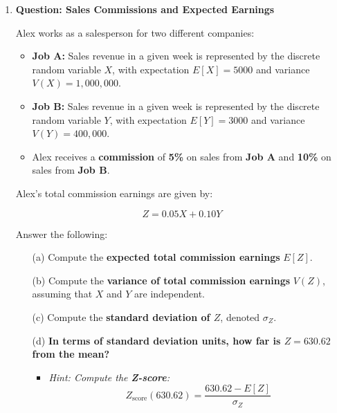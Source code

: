 \documentclass{article}
\newcommand{\blankbox}[2][3cm]{%
    \vspace{-0.5em}
    \begin{figure}[H]
        \makebox[\linewidth]{%
            \begin{tcolorbox}[
                colback=white, 
                colframe=black, 
                width=#2, %
                height=#1,
                boxrule=0.2mm
            ]
            \end{tcolorbox}
        }
    \end{figure}
    \vspace{-1em}
}
\begin{document}
\begin{enumerate}
    \item \textbf{Question: Sales Commissions and Expected Earnings}

    Alex works as a salesperson for two different companies:
    \begin{itemize}
        \item \textbf{Job A:} Sales revenue in a given week is represented by the discrete random variable \( X \), with expectation \( E[X] = 5000 \) and variance \( V(X) = 1,000,000 \).
        \item \textbf{Job B:} Sales revenue in a given week is represented by the discrete random variable \( Y \), with expectation \( E[Y] = 3000 \) and variance \( V(Y) = 400,000 \).
        \item Alex receives a \textbf{commission} of \textbf{5\%} on sales from \textbf{Job A} and \textbf{10\%} on sales from \textbf{Job B}.
    \end{itemize}

    Alex’s total commission earnings are given by:

    \[
    Z = 0.05X + 0.10Y
    \]

    Answer the following:

    \begin{enumerate}
        \item[(a)] Compute the \textbf{expected total commission earnings} \( E[Z] \).
        \blankbox[5cm]{1.1\textwidth}

        \item[(b)] Compute the \textbf{variance of total commission earnings} \( V(Z) \), assuming that \( X \) and \( Y \) are independent.
        \blankbox[5cm]{1.1\textwidth}

        \item[(c)] Compute the \textbf{standard deviation of \( Z \)}, denoted \( \sigma_Z \).
        \blankbox[5cm]{1.1\textwidth}

        \item[(d)] \textbf{In terms of standard deviation units, how far is \( Z = 630.62 \) from the mean?}
        \begin{itemize}
            \item \emph{Hint: Compute the \textbf{Z-score}:}
            \[
            Z_{\text{score}}(630.62) = \frac{630.62 - E[Z]}{\sigma_Z}
            \]
        \end{itemize}
        \blankbox[5cm]{1.1\textwidth}


\end{enumerate}
\end{enumerate}
\end{document}
